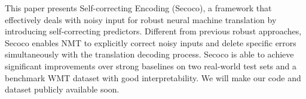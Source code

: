 This paper presents {Se}lf-{co}rrecting En{co}ding (Secoco), a framework that effectively deals with noisy input for robust neural machine translation by introducing self-correcting predictors. Different from previous robust approaches, Secoco enables NMT to explicitly correct noisy inputs and delete specific errors simultaneously with the translation decoding process. Secoco is able to achieve significant improvements over strong baselines on two real-world test sets and a benchmark WMT dataset  with good interpretability. We will make our code and dataset publicly available soon.
